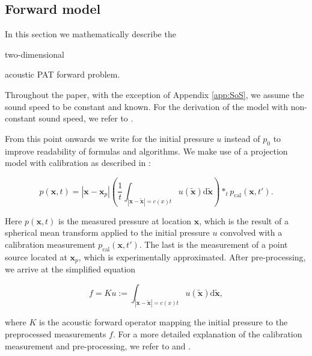 \documentclass[journal]{IEEEtran}
\newcommand{\hl}[1]{\cbcolor{red}\begin{changebar}{\color{red} #1}\end{changebar}}
\begin{document}
\subsection{Forward model}\label{sec:fw_model}
In this section we mathematically describe the \hl{two-dimensional} acoustic PAT forward problem. \hl{Throughout the paper, with the exception of Appendix \ref{app:SoS}, we assume the sound speed to be constant and known. For the derivation of the model with non-constant sound speed, we refer to \cite[section 5.3]{Willemink2010}.} From this point onwards we write for the initial pressure $u$ instead of $p_0$ to improve readability of formulas and algorithms. We make use of a projection model with calibration as described in \cite{Wang2004}:
\hl{\begin{equation}\label{eq:FW_full}
p(\mathbf{x},t) = |\mathbf{x}-\mathbf{x}_p|\left(\frac{1}{t}\int_{|\mathbf{x}-\tilde{\mathbf{x}}|=c(x)t} u(\tilde{\mathbf{x}})\text{d} \tilde{\mathbf{x}}\right)\ast_t p_\text{cal}\left(\mathbf{x},t'\right).
\end{equation}}
Here $p(\mathbf{x},t)$ is the measured pressure at location $\mathbf{x}$, which is the result of a spherical mean transform \cite{Kruger1995} applied to the initial pressure $u$ convolved with a calibration measurement $p_\text{cal}\left(\mathbf{x},t'\right)$. The last is the measurement of a point source located at $\mathbf{x}_p$, which is experimentally approximated. After pre-processing, we arrive at the simplified equation 
\hl{\begin{equation}\label{eq:FW_prep}
f = Ku:=\int_{|\mathbf{x}-\tilde{\mathbf{x}}|=c(x)t} u(\tilde{\mathbf{x}})\text{d} \tilde{\mathbf{x}},
\end{equation}}
where $K$ is the acoustic forward operator mapping the initial pressure to the preprocessed measurements $f$. For a more detailed explanation of the calibration measurement and pre-processing, we refer to \cite[Chapter 2]{Willemink2010} and \cite{Boink2018}.
\end{document}
